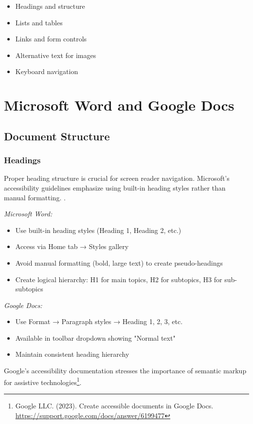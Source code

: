 \begin{itemize}
\item Headings and structure
\item Lists and tables
\item Links and form controls
\item Alternative text for images
\item Keyboard navigation
\end{itemize}

\section{Microsoft Word and Google Docs}
\label{sec:word-google-docs}

\subsection{Document Structure}

\subsubsection{Headings}
Proper heading structure is crucial for screen reader navigation. Microsoft's accessibility guidelines emphasize using built-in heading styles rather than manual formatting.
\cite{MicrosoftWord2023}.

\emph{Microsoft Word:}
\begin{itemize}
\item Use built-in heading styles (Heading 1, Heading 2, etc.)
\item Access via Home tab → Styles gallery
\item Avoid manual formatting (bold, large text) to create pseudo-headings
\item Create logical hierarchy: H1 for main topics, H2 for subtopics, H3 for sub-subtopics
\end{itemize}

\emph{Google Docs:}
\begin{itemize}
\item Use Format → Paragraph styles → Heading 1, 2, 3, etc.
\item Available in toolbar dropdown showing "Normal text"
\item Maintain consistent heading hierarchy
\end{itemize}

Google's accessibility documentation stresses the importance of semantic markup for assistive technologies\footnote{Google LLC. (2023). Create accessible documents in Google Docs. \url{https://support.google.com/docs/answer/6199477}}.

